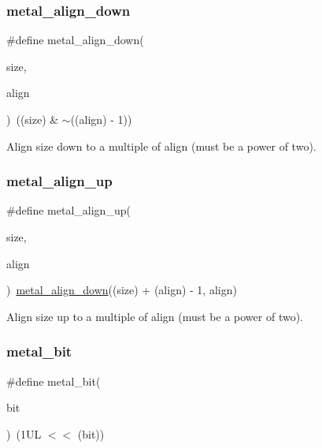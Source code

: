 \subsubsection{\texorpdfstring{metal\+\_\+align\+\_\+down}{metal\_align\_down}}
{\footnotesize\ttfamily \#define metal\+\_\+align\+\_\+down(\begin{DoxyParamCaption}\item[{}]{size,  }\item[{}]{align }\end{DoxyParamCaption})~((size) \& $\sim$((align) -\/ 1))}

Align \textquotesingle{}size\textquotesingle{} down to a multiple of \textquotesingle{}align\textquotesingle{} (must be a power of two). \mbox{\label{group__utilities_ga416a17445a84ce264d90616960082f51}} 
\subsubsection{\texorpdfstring{metal\+\_\+align\+\_\+up}{metal\_align\_up}}
{\footnotesize\ttfamily \#define metal\+\_\+align\+\_\+up(\begin{DoxyParamCaption}\item[{}]{size,  }\item[{}]{align }\end{DoxyParamCaption})~\hyperlink{group__utilities_ga156203f45b1730445ff94ea22f619917}{metal\+\_\+align\+\_\+down}((size) + (align) -\/ 1, align)}

Align \textquotesingle{}size\textquotesingle{} up to a multiple of \textquotesingle{}align\textquotesingle{} (must be a power of two). \mbox{\label{group__utilities_ga89b6d4d2f25b7cb7a1c96f3acb8f0bcb}} 
\subsubsection{\texorpdfstring{metal\+\_\+bit}{metal\_bit}}
{\footnotesize\ttfamily \#define metal\+\_\+bit(\begin{DoxyParamCaption}\item[{}]{bit }\end{DoxyParamCaption})~(1\+U\+L $<$$<$ (bit))}

